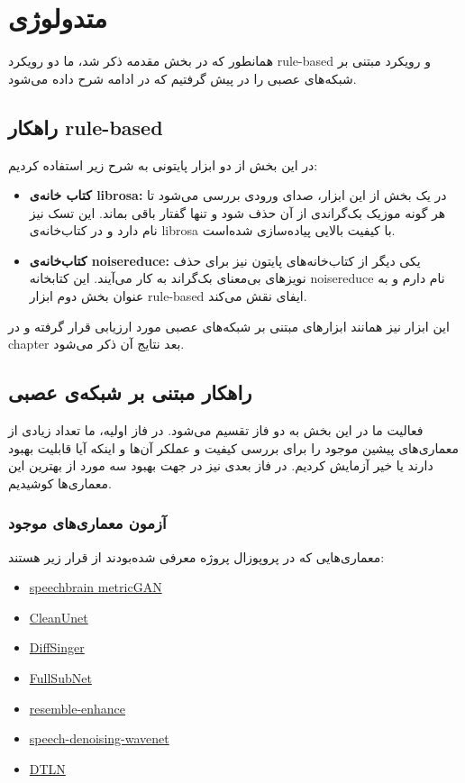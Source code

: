 \documentclass[fleqn]{report}
\begin{document}
\chapter{متدولوژی}
همانطور که در بخش مقدمه ذکر شد، ما دو رویکرد rule-based و رویکرد مبتنی بر شبکه‌های عصبی را در پیش گرفتیم که در ادامه شرح داده می‌شود.

\section{راهکار rule-based}
در این بخش از دو ابزار پایتونی به شرح زیر استفاده کردیم:
\begin{itemize}
    \item \textbf{کتاب خانه‌ی librosa:} در یک بخش از این ابزار، صدای ورودی بررسی می‌شود تا هر گونه موزیک بک‌گراندی از آن حذف شود و تنها گفتار باقی بماند. این تسک  نیز نام دارد و در کتاب‌خانه‌ی librosa با کیفیت بالایی پیاده‌سازی شده‌است.
    \item \textbf{کتاب‌خانه‌ی noisereduce:} یکی دیگر از کتاب‌خانه‌های پایتون نیز برای حذف نویز‌های بی‌معنای بک‌گراند به کار می‌آیند. این کتابخانه noisereduce نام دارم و به عنوان بخش دوم ابزار rule-based ایفای نقش می‌کند.
\end{itemize}

این ابزار نیز همانند ابزار‌های مبتنی بر شبکه‌های عصبی مورد ارزیابی قرار گرفته و در chapter بعد نتایج آن ذکر می‌شود.

\section{راهکار مبتنی بر شبکه‌ی عصبی}
فعالیت ما در این بخش به دو فاز تقسیم می‌شود.
در فاز اولیه، ما تعداد زیادی از معماری‌های پیشین موجود را برای بررسی کیفیت و عملکر آن‌ها و اینکه آیا قابلیت بهبود دارند یا خیر آزمایش کردیم.
در فاز بعدی نیز در جهت بهبود سه مورد از بهترین این معماری‌ها کوشیدیم.

\subsection{آزمون معماری‌های موجود}
معماری‌هایی که در پروپوزال پروژه معرفی شده‌بودند از قرار زیر هستند:

\begin{itemize}
    \item \href{https://github.com/speechbrain/speechbrain/tree/develop/recipes/Voicebank/enhance/MetricGAN}{speechbrain metricGAN}
    \item \href{https://github.com/nvidia/cleanunet}{CleanUnet}
    \item \href{https://github.com/keonlee9420/DiffSinger}{DiffSinger}
    \item \href{https://github.com/haoxiangsnr/FullSubNet}{FullSubNet}
    \item \href{https://github.com/resemble-ai/resemble-enhance}{resemble-enhance}
    \item \href{https://github.com/drethage/speech-denoising-wavenet}{speech-denoising-wavenet}
    \item \href{https://github.com/breizhn/DTLN}{DTLN}
\end{itemize}
\end{document}
